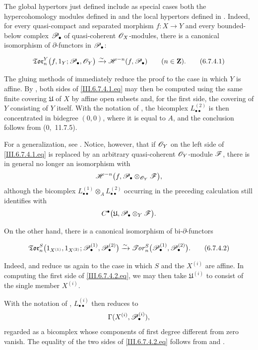 \begin{remark}[6.7.4]
\label{III.6.7.4}
The global hypertors just defined include as special cases both
the hypercohomology modules defined in  and the
local hypertors defined in .  Indeed, for every
quasi-compact and separated morphism $f:X\to Y$ and every
bounded-below complex $\mathscr{P}_\bullet$ of quasi-coherent
$\mathscr{O}_X$-modules, there is a canonical isomorphism of
$\partial$-functors in $\mathscr{P}_\bullet$:
\begin{env}[6.7.4.1]
\label{III.6.7.4.1}
\[
  \mathfrak{Tor}_n^Y
  \bigl(
    f,1_Y;
    \mathscr{P}_\bullet,\mathscr{O}_Y
  \bigr)
  \xrightarrow{\sim}
  \mathscr{H}^{-n}(f,\mathscr{P}_\bullet)
  \qquad(n\in\mathbf Z).
  \tag{6.7.4.1}\label{III.6.7.4.1.eq}
\]
\end{env}
The gluing methods of  immediately reduce the
proof to the case in which $Y$ is affine.  By
, both sides of
\eqref{III.6.7.4.1.eq} may then be computed using the same
finite covering $\mathfrak U$ of $X$ by affine open subsets and,
for the first side, the covering of $Y$ consisting of $Y$
itself.  With the notation of , the bicomplex
$L_{\bullet\bullet}^{(2)}$ is then concentrated in bidegree
$(0,0)$, where it is equal to $A$, and the conclusion follows
from (0,~11.7.5).

For a generalization, see .  Notice, however,
that if $\mathscr{O}_Y$ on the left side of
\eqref{III.6.7.4.1.eq} is replaced by an arbitrary
quasi-coherent $\mathscr{O}_Y$-module $\mathscr{F}$, there is in general no
longer an isomorphism with
\[
  \mathscr{H}^{-n}
  \bigl(
    f,\mathscr{P}_\bullet\otimes_{\mathscr{O}_Y}\mathscr{F}
  \bigr),
\]
although the bicomplex
$L_{\bullet\bullet}^{(1)}\otimes_A
 L_{\bullet\bullet}^{(2)}$ occurring in the preceding
calculation still identifies with
\[
  C^\bullet
  \bigl(
    \mathfrak U,
    \mathscr{P}_\bullet\otimes_Y\mathscr{F}
  \bigr).
\]

On the other hand, there is a canonical isomorphism of
bi-$\partial$-functors
\begin{env}[6.7.4.2]
\label{III.6.7.4.2}
\[
  \mathfrak{Tor}_n^S
  \bigl(
    1_{X^{(1)}},1_{X^{(2)}};
    \mathscr{P}_\bullet^{(1)},\mathscr{P}_\bullet^{(2)}
  \bigr)
  \xrightarrow{\sim}
  \mathscr{T}\!\mathit{or}_n^S
  \bigl(
    \mathscr{P}_\bullet^{(1)},\mathscr{P}_\bullet^{(2)}
  \bigr).
  \tag{6.7.4.2}\label{III.6.7.4.2.eq}
\]
\end{env}
Indeed,  and  reduce us again to
the case in which $S$ and the $X^{(i)}$ are affine.  In
computing the first side of \eqref{III.6.7.4.2.eq}, we may then
take $\mathfrak U^{(i)}$ to consist of the single member
$X^{(i)}$.


With the notation of ,
$L_{\bullet\bullet}^{(i)}$ then reduces to
\[
  \Gamma(X^{(i)},\mathscr{P}_\bullet^{(i)}),
\]
regarded as a bicomplex whose components of first degree
different from zero vanish.  The equality of the two sides of
\eqref{III.6.7.4.2.eq} follows from  and
.
\end{remark}

